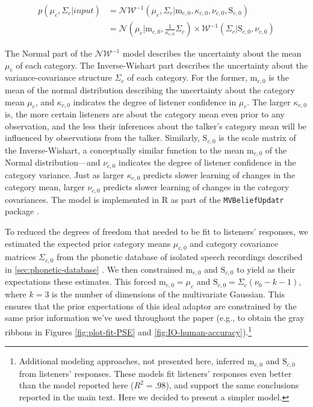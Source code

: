 \documentclass[
  11pt,
  man,mask,floatsintext]{apa6}
\begin{document}
\begin{equation}\label{eq:niw-updating}
\begin{split}
p\left( \mu_c, \Sigma_c | input \right) & = \mathcal{NW}^{-1} \left( \mu_c, \Sigma_c | \mathrm{m}_{c,0}, \kappa_{c,0}, \nu_{c,0}, \mathrm{S}_{c,0} \right) \\
& = \mathcal{N}\left( \mu_c | \mathrm{m}_{c,0}, \frac{1}{\kappa_{c,0}} \Sigma_{c} \right) \times \mathcal{W}^{-1}\left( \Sigma_c | \mathrm{S}_{c,0}, \nu_{c,0} \right)
\end{split}
\end{equation}

The Normal part of the \(\mathcal{NW^{-1}}\) model describes the uncertainty about the mean \(\mu_c\) of each category. The Inverse-Wishart part describes the uncertainty about the variance-covariance structure \(\Sigma_c\) of each category. For the former, \(\mathrm{m}_{c,0}\) is the mean of the normal distribution describing the uncertainty about the category mean \(\mu_c\), and \(\kappa_{c,0}\) indicates the degree of listener confidence in \(\mu_c\). The larger \(\kappa_{c,0}\) is, the more certain listeners are about the category mean even prior to any observation, and the less their inferences about the talker's category mean will be influenced by observations from the talker. Similarly, \(\mathrm{S}_{c,0}\) is the scale matrix of the Inverse-Wishart, a conceptually similar function to the mean \(\mathrm{m}_{c,0}\) of the Normal distribution---and \(\nu_{c,0}\) indicates the degree of listener confidence in the category variance. Just as larger \(\kappa_{c,0}\) predicts slower learning of changes in the category mean, larger \(\nu_{c,0}\) predicts slower learning of changes in the category covariances. The model is implemented in R as part of the \texttt{MVBeliefUpdatr} package \autocite{R-MVBeliefUpdatr}.

To reduced the degrees of freedom that needed to be fit to listeners' responses, we estimated the expected prior category means \(\mu_{c,0}\) and category covariance matrices \(\Sigma_{c,0}\) from the phonetic database of isolated speech recordings described in \ref{sec:phonetic-database} \autocite{chodroff-wilson2018}. We then constrained \(\mathrm{m}_{c,0}\) and \(\mathrm{S}_{c,0}\) to yield as their expectations these estimates. This forced \(\mathrm{m}_{c,0} = \mu_{c}\) and \(\mathrm{S}_{c,0} = \Sigma_{c} (\nu_0-k-1)\), where \(k = 3\) is the number of dimensions of the multivariate Gaussian. This ensures that the prior expectations of this ideal adaptor are constrained by the same prior information we've used throughout the paper (e.g., to obtain the gray ribbons in Figures \ref{fig:plot-fit-PSE} and \ref{fig:IO-human-accuracy}).\footnote{Additional modeling approaches, not presented here, inferred \(\mathrm{m}_{c,0}\) and \(\mathrm{S}_{c,0}\) from listeners' responses. These models fit listeners' responses even better than the model reported here (\(R^2= .98\)), and support the same conclusions reported in the main text. Here we decided to present a simpler model.}
\end{document}
